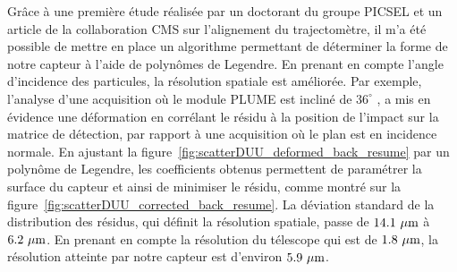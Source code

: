   Grâce à une première étude réalisée par un doctorant du groupe PICSEL et un article de la collaboration CMS sur l'alignement du trajectomètre\cite{CMSalignment}, il m'a été possible de mettre en place un algorithme permettant de déterminer la forme de notre capteur à l'aide de polynômes de Legendre. 
  En prenant en compte l'angle d'incidence des particules, la résolution spatiale est améliorée. 
  Par exemple, l'analyse d'une acquisition où le module PLUME est incliné de $36^{\circ}$ , a mis en évidence une déformation en corrélant le résidu à la position de l'impact sur la matrice de détection, par rapport à une acquisition où le plan est en incidence normale.
  En ajustant la figure~\ref{fig:scatterDUU_deformed_back_resume} par un polynôme de Legendre, les coefficients obtenus permettent de paramétrer la surface du capteur et ainsi de minimiser le résidu, comme montré sur la figure~\ref{fig:scatterDUU_corrected_back_resume}. 
  La déviation standard de la distribution des résidus, qui définit la résolution spatiale, passe de $14.1~\mu\rm{m}$ à $6.2~\mu\rm{m}$.
  En prenant en compte la résolution du télescope qui est de $1.8~\mu\rm{m}$, la résolution atteinte par notre capteur est d'environ $5.9~\mu\rm{m}$. 

